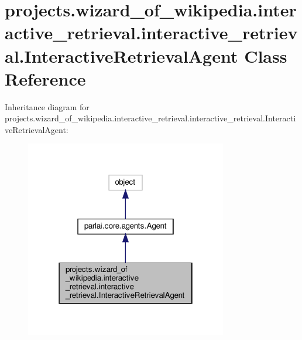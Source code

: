 \hypertarget{classprojects_1_1wizard__of__wikipedia_1_1interactive__retrieval_1_1interactive__retrieval_1_1InteractiveRetrievalAgent}{}\section{projects.\+wizard\+\_\+of\+\_\+wikipedia.\+interactive\+\_\+retrieval.\+interactive\+\_\+retrieval.\+Interactive\+Retrieval\+Agent Class Reference}
\label{classprojects_1_1wizard__of__wikipedia_1_1interactive__retrieval_1_1interactive__retrieval_1_1InteractiveRetrievalAgent}


Inheritance diagram for projects.\+wizard\+\_\+of\+\_\+wikipedia.\+interactive\+\_\+retrieval.\+interactive\+\_\+retrieval.\+Interactive\+Retrieval\+Agent\+:
\nopagebreak
\begin{figure}[H]
\begin{center}
\leavevmode
\includegraphics[width=250pt]{classprojects_1_1wizard__of__wikipedia_1_1interactive__retrieval_1_1interactive__retrieval_1_1Ine5f49c6d75338c69ea75c18db7949361}
\end{center}
\end{figure}


